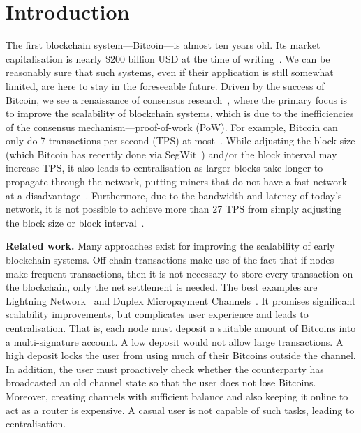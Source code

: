 \section{Introduction}

The first blockchain system---Bitcoin---is almost ten years old. 
Its market capitalisation is nearly \$200 billion USD at the time of writing~\cite{bitcoinmarketcap}.
We can be reasonably sure that such systems,
even if their application is still somewhat limited,
are here to stay in the foreseeable future.
Driven by the success of Bitcoin, we see a renaissance of consensus research~\cite{luu2016elastico, kogias2016enhancing, kokoris2017omniledger},
where the primary focus is to improve the scalability of blockchain systems,
which is due to the inefficiencies of the consensus mechanism---proof-of-work (PoW).
For example, Bitcoin can only do 7 transactions per second (TPS) at most~\cite{vukolic2015quest}.
While adjusting the block size (which Bitcoin has recently done via SegWit~\cite{segwit}) and/or the block interval may increase TPS,
it also leads to centralisation as larger blocks take longer to propagate through the network,
putting miners that do not have a fast network at a disadvantage~\cite{croman2016scaling}.
Furthermore, due to the bandwidth and latency of today's network,
it is not possible to achieve more than 27 TPS from simply adjusting the block size or block interval~\cite{croman2016scaling}.

\textbf{Related work.\quad}
Many approaches exist for improving the scalability of early blockchain systems.
Off-chain transactions make use of the fact that if nodes make frequent transactions,
then it is not necessary to store every transaction on the blockchain,
only the net settlement is needed.
The best examples are Lightning Network~\cite{lightningnetwork} and Duplex Micropayment Channels~\cite{decker2015fast}.
It promises significant scalability improvements, but complicates user experience and leads to centralisation.
That is, each node must deposit a suitable amount of Bitcoins into a multi-signature account.
A low deposit would not allow large transactions.
A high deposit locks the user from using much of their Bitcoins outside the channel.
In addition, the user must proactively check whether the counterparty has broadcasted an old channel state so that the user does not lose Bitcoins.
Moreover, creating channels with sufficient balance and also keeping it online to act as a router is expensive.
A casual user is not capable of such tasks, leading to centralisation.

